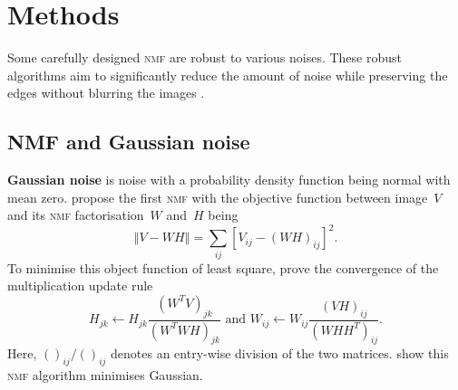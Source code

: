 \section{Methods \label{chapter2}}
Some carefully designed \textsc{nmf} are robust to various noises. These robust algorithms aim to significantly reduce the amount of noise while preserving the edges without blurring the images \citep{barbu2013variational}. %

\subsection{NMF and Gaussian noise}
\textbf{Gaussian noise} is noise with a probability density function being normal with mean zero. \citet{lee2001algorithms} propose the first \textsc{nmf} with the objective function between image~$V$ and its \textsc{nmf} factorisation~$W$ and~$H$ being
\begin{equation}
  \left\Vert V-WH \right\Vert= \sum_{ij} \left[V_{ij}-(WH)_{ij}\right]^2.\label{eq:obnmf}
\end{equation}
To minimise this object function of least square, \citet{lee2001algorithms} prove the convergence of the multiplication update rule
\begin{equation}
H_{jk}\leftarrow H_{jk}\frac{(W^{T}V)_{jk}}{(W^{T}WH)_{jk}} \text{ and } W_{ij}\leftarrow W_{ij}\frac{(VH)_{ij}}{(WHH^{T})_{ij}}.\label{eq:nmf}
\end{equation}
Here, $()_{ij}/()_{ij}$ denotes an entry-wise division of the two matrices. \citet{liu2015performance} show this \textsc{nmf} algorithm minimises Gaussian.

